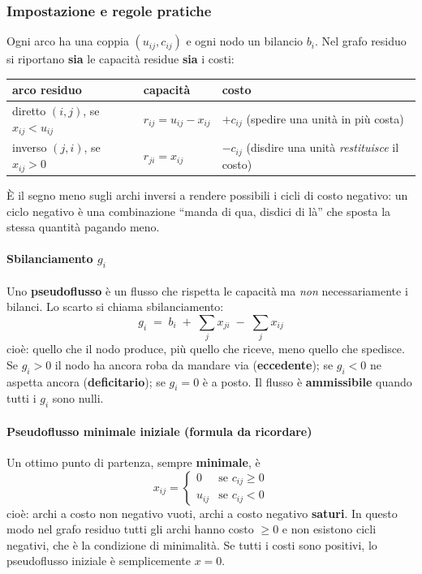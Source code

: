 \documentclass[12pt]{extarticle} %
\begin{document}
\subsubsection{Impostazione e regole pratiche}
Ogni arco ha una coppia $(u_{ij}, c_{ij})$ e ogni nodo un bilancio $b_i$. Nel grafo residuo si riportano \textbf{sia} le capacità residue \textbf{sia} i costi:
\begin{center}
\begin{tabular}{lll}
\hline
\textbf{arco residuo} & \textbf{capacità} & \textbf{costo} \\
\hline
diretto $(i,j)$, se $x_{ij} < u_{ij}$ & $r_{ij} = u_{ij}-x_{ij}$ & $+c_{ij}$ \;(spedire una unità in più costa) \\
inverso $(j,i)$, se $x_{ij} > 0$ & $r_{ji} = x_{ij}$ & $-c_{ij}$ \;(disdire una unità \emph{restituisce} il costo) \\
\hline
\end{tabular}
\end{center}
È il segno meno sugli archi inversi a rendere possibili i cicli di costo negativo: un ciclo negativo è una combinazione ``manda di qua, disdici di là'' che sposta la stessa quantità pagando meno.

\paragraph{Sbilanciamento $g_i$}
Uno \textbf{pseudoflusso} è un flusso che rispetta le capacità ma \emph{non} necessariamente i bilanci. Lo scarto si chiama sbilanciamento:
\[
g_i \;=\; b_i \;+\; \sum_{j} x_{ji} \;-\; \sum_{j} x_{ij}
\]
cioè: quello che il nodo produce, più quello che riceve, meno quello che spedisce. Se $g_i > 0$ il nodo ha ancora roba da mandare via (\textbf{eccedente}); se $g_i < 0$ ne aspetta ancora (\textbf{deficitario}); se $g_i = 0$ è a posto. Il flusso è \textbf{ammissibile} quando tutti i $g_i$ sono nulli.

\paragraph{Pseudoflusso minimale iniziale (formula da ricordare)}
Un ottimo punto di partenza, sempre \textbf{minimale}, è
\[
x_{ij} = \begin{cases}
0 & \text{se } c_{ij} \ge 0\\
u_{ij} & \text{se } c_{ij} < 0
\end{cases}
\]
cioè: archi a costo non negativo vuoti, archi a costo negativo \textbf{saturi}. In questo modo nel grafo residuo tutti gli archi hanno costo $\ge 0$ e non esistono cicli negativi, che è la condizione di minimalità. Se tutti i costi sono positivi, lo pseudoflusso iniziale è semplicemente $x=0$.
\end{document}
